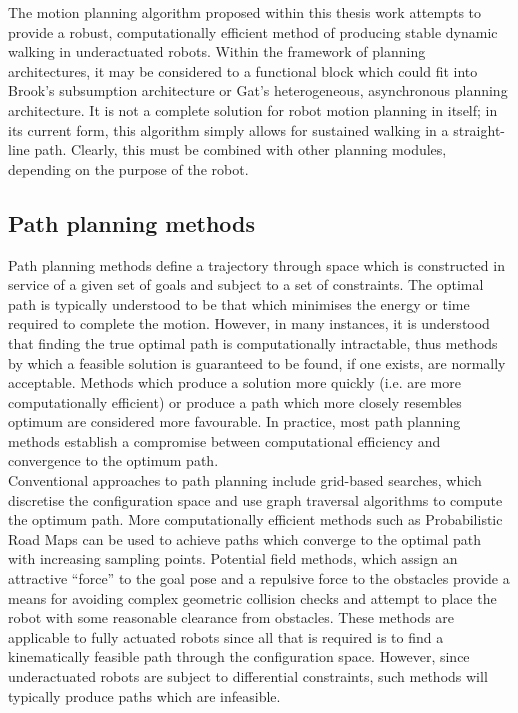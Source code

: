 The motion planning algorithm proposed within this thesis work attempts to provide a robust, computationally efficient method of producing stable dynamic walking in underactuated robots. Within the framework of planning architectures, it may be considered to a functional block which could fit into Brook's subsumption architecture or Gat's heterogeneous, asynchronous planning architecture. It is not a complete solution for robot motion planning in itself; in its current form, this algorithm simply allows for sustained walking in a straight-line path. Clearly, this must be combined with other planning modules, depending on the purpose of the robot.




\subsection{Path planning methods}
Path planning methods define a trajectory through space which is constructed in service of a given set of goals and subject to a set of constraints. The optimal path is typically understood to be that which minimises the energy or time required to complete the motion. However, in many instances, it is understood that finding the true optimal path is computationally intractable, thus methods by which a feasible solution is guaranteed to be found, if one exists, are normally acceptable. Methods which produce a solution more quickly (i.e. are more computationally efficient) or produce a path which more closely resembles optimum are considered more favourable. In practice, most path planning methods establish a compromise between computational efficiency and convergence to the optimum path. \\

Conventional approaches to path planning include grid-based searches, which discretise the configuration space and use graph traversal algorithms to compute the optimum path. More computationally efficient methods such as Probabilistic Road Maps \cite{boor1999gaussian} can be used to achieve paths which converge to the optimal path with increasing sampling points. Potential field methods, which assign an attractive ``force'' to the goal pose and a repulsive force to the obstacles provide a means for avoiding complex geometric collision checks and attempt to place the robot with some reasonable clearance from obstacles. These methods are applicable to fully actuated robots since all that is required is to find a kinematically feasible path through the configuration space. However, since underactuated robots are subject to differential constraints, such methods will typically produce paths which are infeasible. \\

